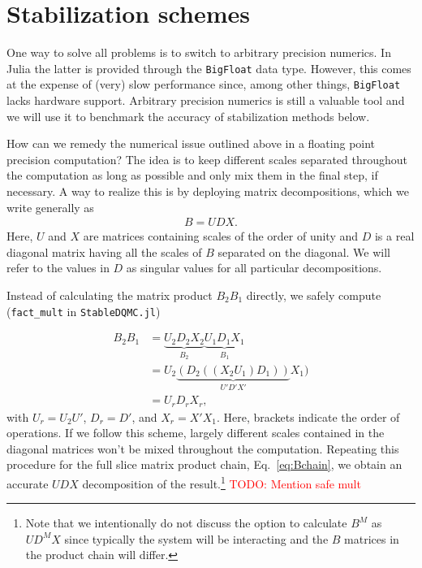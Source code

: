 \documentclass[%
 reprint,
superscriptaddress,
citeautoscript,
showpacs,
 amsmath,amssymb,
 aps,
 prb,
longbibliography,
]{revtex4-1}
\begin{document}
\section{\label{sec:stabilization}Stabilization schemes}

One way to solve all problems is to switch to arbitrary precision numerics. In Julia the latter is provided through the \texttt{BigFloat} data type. However, this comes at the expense of (very) slow performance since, among other things, \texttt{BigFloat} lacks hardware support. Arbitrary precision numerics is still a valuable tool and we will use it to benchmark the accuracy of stabilization methods below.

How can we remedy the numerical issue outlined above in a floating point precision computation? The idea is to keep different scales separated throughout the computation as long as possible and only mix them in the final step, if necessary. A way to realize this is by deploying matrix decompositions, which we write generally as
\begin{align}
	B = UDX.
\end{align}
Here, $U$ and $X$ are matrices containing scales of the order of unity and $D$ is a real diagonal matrix having all the scales of $B$ separated on the diagonal. We will refer to the values in $D$ as singular values for all particular decompositions.

Instead of calculating the matrix product $B_2 B_1$ directly, we safely compute (\texttt{fact\_mult} in \texttt{StableDQMC.jl})

\begin{align}
B_2 B_1 &= \underbrace{U_2 D_2 X_2}_{B_2}\underbrace{U_1 D_1 X_1}_{B_1} \nonumber\\
&= U_2 \underbrace{(D_2 ((X_2 U_1) D_1))}_{U' D' X'} X_1)\\
&= U_r D_r X_r, \nonumber
\end{align}
with $U_r = U_2 U'$, $D_r = D'$, and $X_r = X' X_1$. Here, brackets indicate the order of operations. If we follow this scheme, largely different scales contained in the diagonal matrices won't be mixed throughout the computation. Repeating this procedure for the full slice matrix product chain, Eq.~\eqref{eq:Bchain}, we obtain an accurate $UDX$ decomposition of the result.\footnote{Note that we intentionally do not discuss the option to calculate $B^M$ as $U D^M X$ since typically the system will be interacting and the $B$ matrices in the product chain will differ.} \textcolor{red}{TODO: Mention safe mult}
\end{document}
